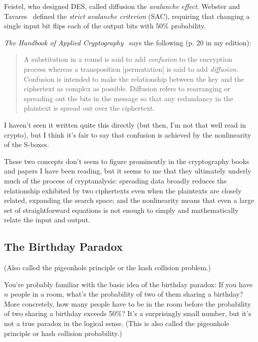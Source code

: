 Feistel, who designed DES, called diffusion the \emph{avalanche
  effect}.  Webster and Tavares~\cite{webster86:avalanche} defined the
\emph{strict avalanche criterion} (SAC), requiring that changing a
single input bit flips each of the output bits with 50\% probability.

\emph{The Handbook of Applied Cryptography}~\cite{menezes1996handbook}
says the following (p. 20 in my edition):

\begin{quote}
A substitution in a round is said to add \emph{confusion} to the
encryption process whereas a transposition [permutation] is said to
add \emph{diffusion}. Confusion is intended to make the relationship
between the key and the ciphertext as complex as possible.  Diffusion
refers to rearranging or spreading out the bits in the message so that
any redundancy in the plaintext is spread out over the ciphertext.
\end{quote}

I haven't seen it written quite this directly (but then, I'm not that
well read in crypto), but I think it's fair to say that confusion is
achieved by the nonlinearity of the S-boxes.

These two concepts don't seem to figure prominently in the
cryptography books and papers I have been reading, but it seems to me
that they ultimately underly much of the process of cryptanalysis:
spreading data broadly reduces the relationship exhibited by two
ciphertexts even when the plaintexts are closely related, expanding
the search space; and the nonlinearity means that even a large set of
straightforward equations is not enough to simply and mathematically
relate the input and output.

\subsection{The Birthday Paradox}

(Also called the pigeonhole principle or the hash collision problem.)

You're probably familiar with the basic idea of the birthday paradox:
If you have $n$ people in a room, what's the probability of two of
them sharing a birthday?  More concretely, how many people have to be
in the room before the probability of two sharing a birthday exceeds
50\%?  It's a surprisingly small number, but it's not a true paradox in
the logical sense.  (This is also called the pigeonhole principle or
hash collision probability.)

